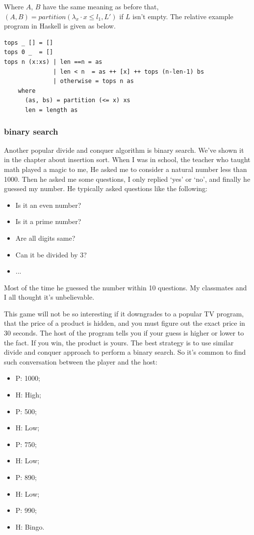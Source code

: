 \documentclass[UTF8]{article}
\begin{document}
Where $A$, $B$ have the same meaning as before that, $(A, B) = partition(\lambda_x \cdot x \leq l_1, L')$ if $L$ isn't
empty. The relative example program in Haskell is given as below.

\lstset{language=Haskell}
\begin{lstlisting}
tops _ [] = []
tops 0 _  = []
tops n (x:xs) | len ==n = as
              | len < n  = as ++ [x] ++ tops (n-len-1) bs
              | otherwise = tops n as
    where
      (as, bs) = partition (<= x) xs
      len = length as
\end{lstlisting}

\subsubsection{binary search}
Another popular divide and conquer algorithm is binary search. We've shown it in the chapter about insertion sort.
When I was in school, the teacher who taught math played a magic to me, He asked me to consider a natural number
less than 1000. Then he asked me some questions, I only replied `yes' or `no', and finally he guessed my number.
He typically asked questions like the following:

\begin{itemize}
\item Is it an even number?
\item Is it a prime number?
\item Are all digits same?
\item Can it be divided by 3?
\item ...
\end{itemize}

Most of the time he guessed the number within 10 questions. My classmates and I all thought it's unbelievable.

This game will not be so interesting if it downgrades to a popular TV program, that the price of a product
is hidden, and you must figure out the exact price in 30 seconds. The host of the program tells you if
your guess is higher or lower to the fact. If you win, the product is yours. The best strategy is
to use similar divide and conquer approach to perform a binary search. So it's common to find such
conversation between the player and the host:

\begin{itemize}
\item P: 1000;
\item H: High;
\item P: 500;
\item H: Low;
\item P: 750;
\item H: Low;
\item P: 890;
\item H: Low;
\item P: 990;
\item H: Bingo.
\end{itemize}
\end{document}
